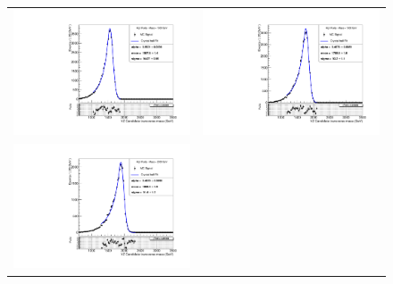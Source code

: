 \begin{figure}[!ht]
\begin{tabular}{cc}
  \includegraphics[width=170pt]{figuresARC/fits/BulkGravHP1600.pdf} &
  \includegraphics[width=170pt]{figuresARC/fits/BulkGravHP1800.pdf} \\
  \includegraphics[width=170pt]{figuresARC/fits/BulkGravHP2000.pdf} \\ 
\end{tabular}
\label{fig:fits6a}
\end{figure}

